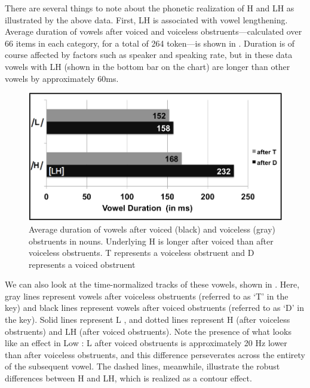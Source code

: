 \documentclass[output=paper
,newtxmath
,modfonts
,nonflat]{langsci/langscibook}
\begin{document}
There are several things to note about the phonetic realization of H and LH as illustrated by the above data. First, LH  is associated with vowel lengthening. Average duration of vowels after voiced and voiceless obstruents—calculated over 66 items in each category, for a total of 264 token—is shown in . Duration is of course affected by factors such as speaker and speaking rate, but in these data vowels with LH  (shown in the bottom bar on the chart) are longer than other vowels by approximately 60ms.


\begin{figure} 
\includegraphics[width=\textwidth]{figures/Lotven-img3.png}
\caption{\label{fig:lotven:3} Average duration of vowels after voiced (black) and voiceless (gray) obstruents in nouns. Underlying H is longer after voiced than after voiceless obstruents. T represents a voiceless obstruent and D represents a voiced obstruent}
\end{figure}



We can also look at the time-normalized  tracks of these vowels, shown in . Here, gray lines represent vowels after voiceless obstruents (referred to as ‘T’ in the key) and black lines represent vowels after voiced obstruents (referred to as ‘D’ in the key). Solid lines represent L , and dotted lines represent H (after voiceless obstruents) and LH (after voiced obstruents). Note the presence of what looks like an   effect in Low : L after voiced obstruents is approximately 20 Hz lower than after voiceless obstruents, and this difference perseverates across the entirety of the subsequent vowel. The dashed lines, meanwhile, illustrate the robust  differences between H and LH, which is realized as a contour effect. 
\end{document}
